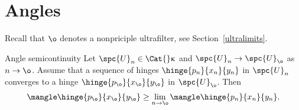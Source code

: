 


\section{Angles}
\label{sec:angles-cba}

Recall that $\o$ denotes a nonpriciple ultrafilter, see Section~\ref{ultralimits}. 

\begin{thm}{Angle semicontinuity}\label{lem:ang.semicont}
Let $\spc{U}_n\in \Cat{}\kappa$ 
and $\spc{U}_n\to \spc{U}_\o$ as $n\to\o$.
Assume that a sequence of hinges $\hinge{p_n}{x_n}{y_n}$ in $\spc{U}_n$ converges to a hinge $\hinge{p_\o}{x_\o}{y_\o}$ in  $\spc{U}_\o$.
Then 
\[\mangle\hinge{p_\o}{x_\o}{y_\o}
\ge 
\lim_{n\to\o} \mangle\hinge{p_n}{x_n}{y_n}.\]

\end{thm}


